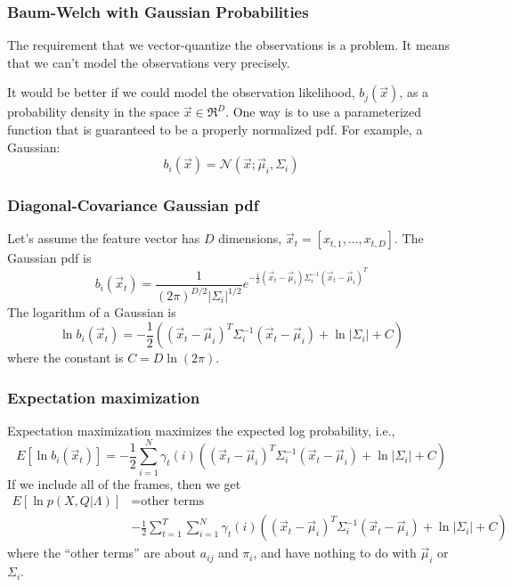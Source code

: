 \documentclass{beamer}
\begin{document}
\begin{frame}
  \frametitle{Baum-Welch with Gaussian Probabilities}

  The requirement that we vector-quantize the observations is a
  problem.  It means that we can't model the observations very precisely.

  It would be better if we could model the observation likelihood,
  $b_j(\vec{x})$, as a probability density in the space
  $\vec{x}\in\Re^D$.  One way is to use a parameterized function that
  is guaranteed to be a properly normalized pdf.  For example, a
  Gaussian:
  \begin{displaymath}
    b_i(\vec{x}) = {\mathcal N}\left(\vec{x};\vec\mu_i,\Sigma_i\right)
  \end{displaymath}
\end{frame}
  
\begin{frame}
  \frametitle{Diagonal-Covariance Gaussian pdf}

  Let's assume the feature vector has $D$ dimensions,
  $\vec{x}_t=[x_{t,1},\ldots,x_{t,D}]$.  The Gaussian pdf is
  \begin{displaymath}
    b_i(\vec{x}_t) = 
    \frac{1}{(2\pi)^{D/2}|\Sigma_i|^{1/2}}e^{-\frac{1}{2}(\vec{x}_t-\vec\mu_i)\Sigma_i^{-1}(\vec{x}_t-\vec\mu_i)^T}
  \end{displaymath}
  The logarithm of a Gaussian is
  \begin{displaymath}
    \ln b_i(\vec{x}_t)=
    -\frac{1}{2}\left((\vec{x}_t-\vec\mu_i)^T\Sigma_i^{-1}(\vec{x}_t-\vec\mu_i)
    +\ln|\Sigma_i| + C\right)
  \end{displaymath}
  where the constant is $C=D\ln(2\pi)$.
\end{frame}

\begin{frame}
  \frametitle{Expectation maximization}

  Expectation maximization maximizes the expected
  log probability, i.e.,
  \begin{displaymath}
    E\left[\ln b_i(\vec{x}_t)\right]=
    -\frac{1}{2}\sum_{i=1}^N \gamma_t(i)\left(
    (\vec{x}_t-\vec\mu_i)^T\Sigma_i^{-1}(\vec{x}_t-\vec\mu_i)
    +\ln|\Sigma_i|+C\right)
  \end{displaymath}
  If we include all of the frames, then we get
  \begin{align*}
    E\left[\ln p(X,Q|\Lambda)\right] &= \mbox{other terms}\\
    &-\frac{1}{2}\sum_{t=1}^T \sum_{i=1}^N \gamma_t(i)\left(
    (\vec{x}_t-\vec\mu_i)^T\Sigma_i^{-1}(\vec{x}_t-\vec\mu_i)
    +\ln|\Sigma_i|+C\right) 
  \end{align*}
  where the ``other terms'' are about $a_{ij}$ and $\pi_i$, and have
  nothing to do with $\vec\mu_i$ or $\Sigma_i$.
\end{frame}
  
\end{document}
